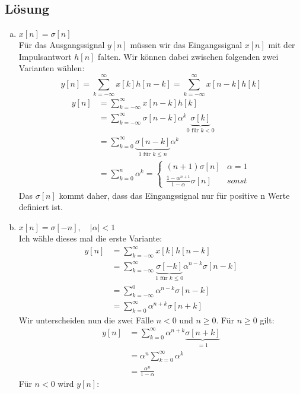 \subsection*{Lösung}
	\begin{enumerate}[a)]
		\item $x[n]=\sigma [n]$ \\
			Für das Ausgangssignal $y[n]$ müssen wir das Eingangssignal $x[n]$ mit der Impulsantwort $h[n]$ falten. Wir können dabei zwischen folgenden zwei Varianten wählen:
			\[
				y[n] = \sum_{k=-\infty}^{\infty}x[k]h[n-k]=\sum_{k=-\infty}^{\infty}x[n-k]h[k]
			\]
			\begin{align*}
				y[n]	&= \sum_{k=-\infty}^{\infty}x[n-k]h[k] \\
						&= \sum_{k=-\infty}^{\infty}\sigma [n-k] \alpha^k \underbrace{\sigma [k]}_{0 \text{ für } k<0} \\
						&= \sum_{k=0}^{\infty}\underbrace{\sigma [n-k]}_{1 \text{ für } k \le n} \alpha^k \\
						&= \sum_{k=0}^{n} \alpha^k = \left\{ \begin{array}{ll} (n+1)\sigma [n] & \alpha=1\\ \frac{1-\alpha^{n+1}}{1-\alpha}\sigma [n] & sonst \end{array} \right.
			\end{align*}
			Das $\sigma [n]$ kommt daher, dass das Eingangssignal nur für positive n Werte definiert ist.
		\item $x[n]=\sigma [-n], \quad |\alpha|<1$ \\
			Ich wähle dieses mal die erste Variante:
			\begin{align*}
				y[n]	&= \sum_{k=-\infty}^{\infty}x[k]h[n-k] \\
						&= \sum_{k=-\infty}^{\infty}\underbrace{\sigma [-k]}_{1 \text{ für } k \le 0} \alpha ^{n-k} \sigma [n-k] \\
						&= \sum_{k=-\infty}^{0}\alpha^{n-k} \sigma [n-k] \\
						&= \sum_{k=0}^{\infty}\alpha^{n+k} \sigma [n+k]
			\end{align*}
			Wir unterscheiden nun die zwei Fälle $n<0$ und $n \ge 0$. Für $n \ge 0$ gilt:
			\begin{align*}
				y[n]	&= \sum_{k=0}^{\infty}\alpha^{n+k} \underbrace{\sigma [n+k]}_{=1} \\
						&= \alpha ^n \sum_{k=0}^{\infty}\alpha^{k} \\
						&= \frac{\alpha ^n}{1-\alpha}
			\end{align*}
			Für $n<0$ wird $y[n]$:

\end{enumerate}
